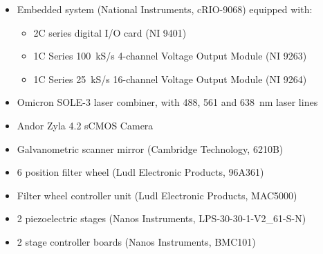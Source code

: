 \begin{singlespace}
  \begin{itemize}
    \item Embedded system (National Instruments, cRIO-9068) equipped with:
    \begin{itemize}
      \item 2\texttimes C series digital I/O card (NI 9401)
      \item 1\texttimes C Series \SI{100}{kS/s} 4-channel Voltage Output Module (NI 9263)
      \item 1\texttimes C Series \SI{25}{kS/s} 16-channel Voltage Output Module (NI 9264)
    \end{itemize}
    \item Omicron SOLE-3 laser combiner, with 488, 561 and \SI{638}{nm} laser lines
    \item Andor Zyla 4.2 sCMOS Camera
    \item Galvanometric scanner mirror (Cambridge Technology, 6210B)
    \item 6 position filter wheel (Ludl Electronic Products, 96A361)
    \item Filter wheel controller unit (Ludl Electronic Products, MAC5000)
    \item 2 piezoelectric stages (Nanos Instruments, LPS-30-30-1-V2\_61-S-N) 
    \item 2 stage controller boards (Nanos Instruments, BMC101)
  \end{itemize}
\end{singlespace}